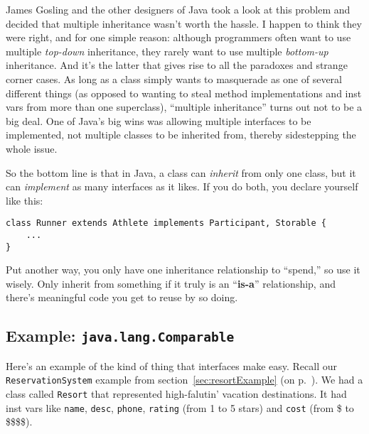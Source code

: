 James Gosling and the other designers of Java took a look at this problem and
decided that multiple inheritance wasn't worth the hassle. I happen to think
they were right, and for one simple reason: although programmers often want to
use multiple \textit{top-down} inheritance, they rarely want to use multiple
\textit{bottom-up} inheritance. And it's the latter that gives rise to all the
paradoxes and strange corner cases. As long as a class simply wants to
masquerade as one of several different things (as opposed to wanting to steal
method implementations and inst vars from more than one superclass), ``multiple
inheritance'' turns out not to be a big deal. One of Java's big wins was
allowing multiple interfaces to be implemented, not multiple classes to be
inherited from, thereby sidestepping the whole issue.

\begin{samepage}
So the bottom line is that in Java, a class can \textit{inherit} from only one
class, but it can \textit{implement} as many interfaces as it likes. If you do
both, you declare yourself like this:

\begin{Verbatim}[fontsize=\footnotesize,samepage=true,frame=single]
class Runner extends Athlete implements Participant, Storable {
    ...
}
\end{Verbatim}
\end{samepage}

Put another way, you only have one inheritance relationship to ``spend,'' so
use it wisely. Only inherit from something if it truly is an ``\textbf{is-a}''
relationship, and there's meaningful code you get to reuse by so doing.

\subsection{Example: \texttt{java.lang.Comparable}}

Here's an example of the kind of thing that interfaces make easy. Recall our
\texttt{ReservationSystem} example from section~\ref{sec:resortExample} (on
p.~\pageref{sec:resortExample}). We had a class called \texttt{Resort} that
represented high-falutin' vacation destinations. It had inst vars like
\texttt{name}, \texttt{desc}, \texttt{phone}, \texttt{rating} (from 1 to 5
stars) and \texttt{cost} (from \$ to \$\$\$\$).

